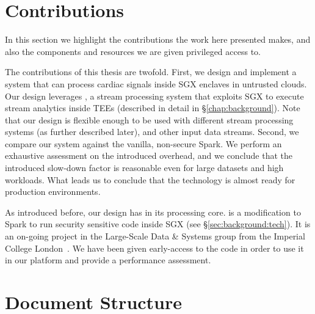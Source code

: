 \section{Contributions}

In this section we highlight the contributions the work here presented makes, and also the components and resources we are given privileged access to.

The contributions of this thesis are twofold.
First, we design and implement a system that can process cardiac signals inside SGX enclaves in untrusted clouds.
Our design leverages \sgxspark, a stream processing system that exploits SGX to execute stream analytics inside TEEs (described in detail in \S\ref{chap:background}).
Note that our design is flexible enough to be used with different stream processing systems (as further described later), and other input data streams.
Second, we compare our system against the vanilla, non-secure Spark.
We perform an exhaustive assessment on the introduced overhead, and we conclude that the introduced slow-down factor is reasonable even for large datasets and high workloads.
What leads us to conclude that the technology is almost ready for production environments.

As introduced before, our design has \sgxspark in its processing core.
\sgxspark is a modification to Spark to run security sensitive code inside SGX (see \S\ref{sec:background:tech}).
It is an on-going project in the Large-Scale Data \& Systems group from the Imperial College London~\cite{lsds}.
We have been given early-access to the code in order to use it in our platform and provide a performance assessment.

\section{Document Structure}

